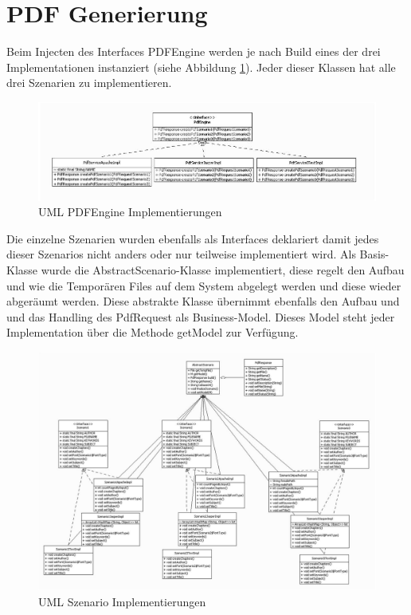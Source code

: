 \documentclass[main.tex]{subfiles}
\begin{document}
\section{PDF Generierung}

Beim Injecten des Interfaces PDFEngine werden je nach Build eines der drei Implementationen instanziert (siehe Abbildung \ref{figure:pdfEngineImpl}). Jeder dieser Klassen hat alle drei Szenarien zu implementieren.  


\begin{figure}[h]
 
\includegraphics[width=\textwidth ]{pic/uml/PdfEngineImplemntierung.jpg}
 \caption{UML PDFEngine Implementierungen}
 \label{figure:pdfEngineImpl}
\end{figure}

Die einzelne Szenarien wurden ebenfalls als Interfaces deklariert damit jedes dieser Szenarios nicht anders oder nur teilweise implementiert wird. Als Basis-Klasse wurde die AbstractScenario-Klasse implementiert, diese regelt den Aufbau und wie die Temporären Files auf dem System abgelegt werden und diese wieder abgeräumt werden. Diese abstrakte Klasse übernimmt ebenfalls den Aufbau und und das Handling des PdfRequest als Business-Model. Dieses Model steht jeder Implementation über die Methode getModel zur Verfügung.   

\begin{figure}[h]
\includegraphics[width=\textwidth ]{pic/uml/SzenarioImplementation.jpg}
 \caption{UML Szenario Implementierungen}
 \label{figure:szenImpl}
\end{figure}
\end{document}
